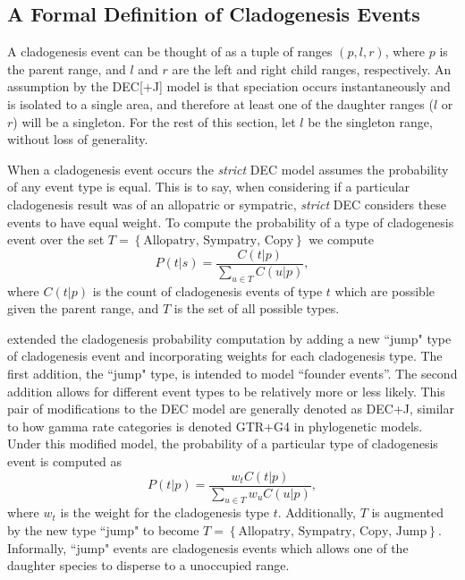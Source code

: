 \documentclass[a4paper]{article}
\begin{document}
\subsection{A Formal Definition of Cladogenesis Events}
\label{sec:formal-cladogenesis}

A cladogenesis event can be thought of as a tuple of ranges $(p, l, r)$, where $p$ is the parent range, and $l$ and $r$
are the left and right child ranges, respectively. 
An assumption by the DEC[+J] model is that speciation occurs instantaneously and is isolated to a single area, and
therefore at least one of the daughter ranges ($l$ or $r$) will be a singleton.
For the rest of this section, let $l$ be the singleton range, without loss of generality.

When a cladogenesis event occurs the \textit{strict} DEC model assumes the probability of any event type is equal.
This is to say, when considering if a particular cladogenesis result was of an allopatric or sympatric, \textit{strict}
DEC considers these events to have equal weight.
To compute the probability of a type of cladogenesis event over the set \(T = \left\{\text{Allopatry,
Sympatry, Copy}\right\}\) we compute
\[
	P(t |
	s) = \frac{C(t | p)}{\sum_{u \in T} C(u | p)},
\]
where \( C(t|p) \) is the count of cladogenesis events of type $t$ which are possible given the parent range, and $T$ is
the set of all possible types.

\citet{ModelSelectionMatzke2014} extended the cladogenesis probability computation by adding a new ``jump" type of
cladogenesis event and incorporating weights for each cladogenesis type.
The first addition, the ``jump" type, is intended to model ``founder events''.
The second addition allows for different event types to be relatively more or less likely.
This pair of modifications to the DEC model are generally denoted as DEC+J, similar to how gamma rate categories is
denoted GTR+G4 in phylogenetic models.
Under this modified model, the probability of a particular type of cladogenesis event is computed as
\begin{equation}
	P(t | p) = \frac{w_t C(t | p)}{\sum_{u \in T} w_u C(u | p)},
\end{equation}
where $w_t$ is the weight for the cladogenesis type $t$.
Additionally, $T$ is augmented by the new type ``jump" to become \(T = \left\{\text{Allopatry, Sympatry, Copy,
Jump}\right\} \).
Informally, ``jump" events are cladogenesis events which allows one of the daughter species to disperse to a unoccupied
range.
\end{document}
